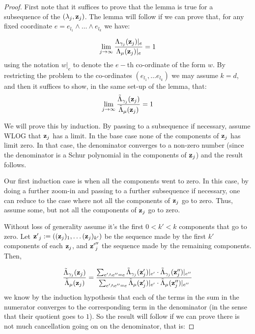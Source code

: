 	\begin{proof}
		First note that it suffices to prove that the lemma is true for a subsequence of the $(\lambda_j,{\bf z}_j)$. The lemma will follow if we can prove that, for any fixed coordinate $e = e_{l_1} \wedge \dots \wedge e_ {l_k}$ we have:

		\begin{equation}
			\lim_{j\to \infty} \frac{\Lambda_{\gamma_j}({\bf z}_j)|_e}
			{\Lambda_{\mu}({\bf z}_j)|_e} = 1
		\end{equation}
	using the notation $w|_e$ to denote the $e-$th co-ordinate of the form $w$. By restricting the problem to the co-ordinates $(e_{l_1}, \dots  e_ {l_k})$ we may assume $k=d$, and then it suffices to show, in the same set-up of the lemma, that:
	\begin{equation}
			\lim_{j\to \infty} \frac{\tilde \Lambda_{\gamma_j}({\bf z}_j)}
			{\tilde \Lambda_{\mu}({\bf z}_j)} = 1
	\end{equation}

	We will prove this by induction. By passing to a subsequence if necessary, assume WLOG that ${\bf z}_j$ has a limit. In the base case none of the components of ${\bf z}_j$ has limit zero. In that case, the denominator converges to a non-zero number (since the denominator is a Schur polynomial in the components of ${\bf z}_j$) and the result follows. 

	Our first induction case is when all the components went to zero. In this case, by doing a further zoom-in and passing to a further subsequence if necessary, one can reduce to the case where not all the components of ${\bf z}_j$ go to zero. Thus, assume some, but not all the components of ${\bf z}_j$ go to zero.

	Without loss of generality assume it's the first $0<k'<k$ components that go to zero. Let ${{\bf z}'}_j:= (({\bf z}_j)_1, \dots ({\bf z}_j)_{k'})$ be the sequence made by the first $k'$ components of each ${\bf z}_j$, and ${{\bf z}'}''_j$ the sequence made by the remaining components. Then,

	\begin{equation}
		 \frac{\tilde \Lambda_{\gamma_j}({\bf z}_j)}
			{\tilde \Lambda_{\mu}({\bf z}_j)}
		=  \frac
		{ \sum_{e'\wedge e'' = e}\tilde \Lambda_{\gamma_j}({\bf z}'_j)|_{e'}
			\cdot
		\tilde \Lambda_{\gamma_j}({\bf z}''_j)|_{e''}}
		{ \sum_{e'\wedge e'' = e}\tilde \Lambda_{\mu}({\bf z}'_j)|_{e'}
			\cdot
		\tilde \Lambda_{\mu}({\bf z}''_j)|_{e''}}
	\end{equation}
	we know by the induction hypothesis that each of the terms in the sum in the numerator converges to the corresponding term in the denominator (in the sense that their quotient goes to $1$). So the result will follow if we can prove there is not much cancellation going on on the denominator, that is:


\end{proof}
